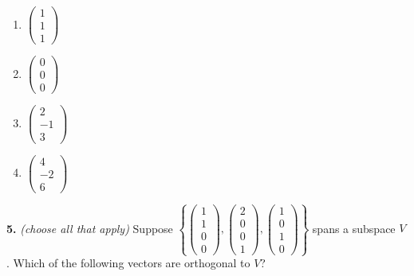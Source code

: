 \documentclass[10pt,a4paper]{article}
\begin{document}
\begin{enumerate}[label=(\Alph*)]
\item \(\begin{pmatrix}1\\1\\1\end{pmatrix}\)
\item \(\begin{pmatrix}0\\0\\0\end{pmatrix}\)
\item \(\begin{pmatrix}2\\-1\\3\end{pmatrix}\)
\item \(\begin{pmatrix}4\\-2\\6\end{pmatrix}\)
\end{enumerate}
\smallskip
\textbf{5.} \textit{(choose all that apply)} Suppose \(\left\{\begin{pmatrix}1\\1\\0\\0\end{pmatrix},\begin{pmatrix}2\\0\\0\\1\end{pmatrix},\begin{pmatrix}1\\0\\1\\0\end{pmatrix}\right\}\) spans a subspace \(V\). Which of the following vectors are orthogonal to \(V\)?
\end{document}
